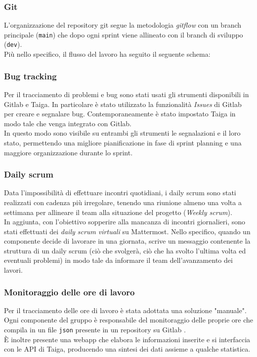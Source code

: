\documentclass[11pt]{article}
\begin{document}
\subsubsection{Git}
L'organizzazione del repository git segue la metodologia \textit{gitflow} con un branch principale (\texttt{main}) che dopo ogni sprint viene allineato
con il branch di sviluppo (\texttt{dev}).\\
Più nello specifico, il flusso del lavoro ha seguito il seguente schema:


\subsubsection{Bug tracking}
Per il tracciamento di problemi e bug sono stati usati gli strumenti disponibili in Gitlab e Taiga.
In particolare è stato utilizzato la funzionalità \textit{Issues} di Gitlab per creare e segnalare bug. 
Contemporaneamente è stato impostato Taiga in modo tale che venga integrato con Gitlab.\\
In questo modo sono visibile su entrambi gli strumenti le segnalazioni e il loro stato, permettendo una migliore pianificazione in fase di sprint planning e
una maggiore organizzazione durante lo sprint.

\subsubsection{Daily scrum}
Data l'impossibilità di effettuare incontri quotidiani, i daily scrum sono stati realizzati con cadenza più irregolare, tenendo una riunione almeno una volta a settimana
per allineare il team alla situazione del progetto (\textit{Weekly scrum}).\\
In aggiunta, con l'obiettivo sopperire alla mancanza di incontri giornalieri, sono stati effettuati dei \textit{daily scrum virtuali} su Mattermost.
Nello specifico, quando un componente decide di lavorare in una giornata, scrive un messaggio contenente la struttura di un daily scrum (ciò che svolgerà, ciò che ha svolto l'ultima volta ed eventuali problemi)
in modo tale da informare il team dell'avanzamento dei lavori.

\subsubsection{Monitoraggio delle ore di lavoro}
Per il tracciamento delle ore di lavoro è stata adottata una soluzione "manuale".
Ogni componente del gruppo è responsabile del monitoraggio delle proprie ore che compila in un file \texttt{json} presente in un repository su Gitlab \cite{timetracker_git}.\\
È inoltre presente una webapp \cite{timetracker} che elabora le informazioni inserite e si interfaccia con le API di Taiga, 
producendo una sintesi dei dati assieme a qualche statistica. 
\end{document}
